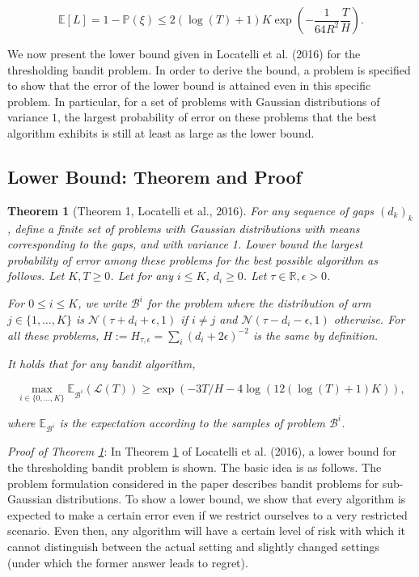 \documentclass[12pt,]{article}
\newtheorem{theorem}{Theorem}
\begin{document}
\[
\mathbb{E}[L] = 1 - \mathbb{P}(\xi) \leq 2(\log(T)+1)K \exp(-\frac{1}{64R^2}\frac{T}{H}).
\]

We now present the lower bound given in Locatelli et al. (2016) for the
thresholding bandit problem. In order to derive the bound, a problem is
specified to show that the error of the lower bound is attained even in
this specific problem. In particular, for a set of problems with
Gaussian distributions of variance \(1\), the largest probability of
error on these problems that the best algorithm exhibits is still at
least as large as the lower bound.

\subsection{\texorpdfstring{Lower Bound: Theorem and Proof
\label{sec:LowerBoundLocatelli}}{Lower Bound: Theorem and Proof }}\label{lower-bound-theorem-and-proof}

\begin{theorem}[Theorem 1, Locatelli et al., 2016] 
\label{theorem:Locatelli2016Theorem1}
For any sequence of gaps $(d_k)_k$, define a finite set of problems with Gaussian distributions with means corresponding to the gaps, and with variance 1. Lower bound the largest probability of error among these problems for the best possible algorithm as follows. Let $K,T \geq 0$. Let for any $i \leq K$, $d_i \geq 0$. Let $\tau \in \mathbb{R}, \epsilon > 0$.

For $0 \leq i \leq K$, we write $\mathcal{B}^i$ for the problem where the distribution of arm $j \in \{1, \dots, K\}$ is $\mathcal{N}(\tau+d_i+\epsilon, 1)$ if $i \neq j$ and $\mathcal{N}(\tau-d_i-\epsilon, 1)$ otherwise. For all these problems, $H := H_{\tau, \epsilon} = \sum_i (d_i+2\epsilon)^{-2}$ is the same by definition.

It holds that for any bandit algorithm,

\begin{equation*}
\max_{i \in \{0, \dots, K\}} \mathbb{E}_{\mathcal{B}^i} (\mathcal{L}(T)) \geq \exp(-3T/H-4 \log(12(\log(T)+1)K)),
\end{equation*}

where $\mathbb{E}_{\mathcal{B}^i}$ is the expectation according to the samples of problem $\mathcal{B}^i$.
\end{theorem}

\emph{Proof of Theorem \ref{theorem:Locatelli2016Theorem1}}: In Theorem
\ref{theorem:Locatelli2016Theorem1} of Locatelli et al. (2016), a lower
bound for the thresholding bandit problem is shown. The basic idea is as
follows. The problem formulation considered in the paper describes
bandit problems for sub-Gaussian distributions. To show a lower bound,
we show that every algorithm is expected to make a certain error even if
we restrict ourselves to a very restricted scenario. Even then, any
algorithm will have a certain level of risk with which it cannot
distinguish between the actual setting and slightly changed settings
(under which the former answer leads to regret).
\end{document}
